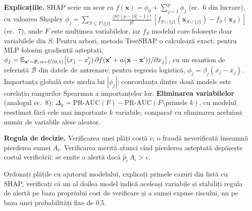 %
{\textbf{Explicațiile.} SHAP scrie un scor ca $f(\mathbf x)=\phi_0+\sum_{j=1}^{p}\phi_j$ (ec.~6 din lucrare), cu valoarea Shapley $\phi_j=\sum_{S\subseteq F\setminus\{j\}}\frac{|S|!(p-|S|-1)!}{p!}\,[f_{S\cup\{j\}}(\mathbf x_{S\cup\{j\}})-f_S(\mathbf x_S)]$ (ec.~7), unde $F$ este mulțimea variabilelor, iar $f_S$ modelul care folosește doar variabilele din $S$.
Pentru arbori, metoda TreeSHAP o calculează exact; pentru MLP folosim gradienții așteptați, $\phi_j=\mathbb{E}_{\mathbf x'\sim\mathcal B,\,\alpha\sim U(0,1)}\big[(x_j-x'_j)\,\partial f(\mathbf x'+\alpha(\mathbf x-\mathbf x'))/\partial x_j\big]$, cu un eșantion de referință $\mathcal B$ din datele de antrenare; pentru regresia logistică, $\phi_j=\beta_j(x_j-\bar x_j)$.
Importanța globală este media lui $|\phi_j|$; concordanța dintre două modele este corelația rangurilor Spearman a importanțelor lor.
\textbf{Eliminarea variabilelor} (analogul ec.~8): $\Delta_k=\text{PR-AUC}(F)-\text{PR-AUC}(F\setminus\text{primele }k)$, cu modelul reestimat fără cele mai importante $k$ variabile, comparat cu eliminarea aceluiași număr de variabile alese aleator.}

%
{\textbf{Regula de decizie.} Verificarea unei plăți costă $c$; o fraudă neverificată înseamnă pierderea sumei $A_i$. Verificarea merită atunci cînd pierderea așteptată depășește costul verificării: se emite o alertă dacă $\hat p_i\,A_i>c$.}
\begin{decision}
%
{Ordonați plățile cu ajutorul modelului, explicați primele cazuri din listă cu SHAP, verificați că un al doilea model indică aceleași variabile și stabiliți regula de alertă pe baza propriului cost de verificare și a sumei expuse riscului, nu pe baza unei probabilități fixe de 0,5.}
\end{decision}

